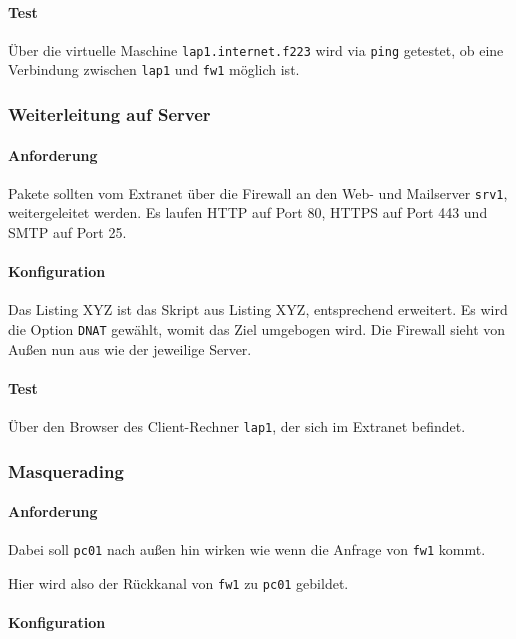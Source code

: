 \paragraph{Test} Über die virtuelle Maschine {\tt lap1.internet.f223} wird
via {\tt ping} getestet, ob eine Verbindung zwischen {\tt lap1} und {\tt fw1}
möglich ist.


\subsubsection{Weiterleitung auf Server}

\paragraph{Anforderung} Pakete sollten vom Extranet über die Firewall an
den Web- und Mailserver {\tt srv1}, weitergeleitet werden.
Es laufen HTTP auf Port 80, HTTPS auf Port 443 und SMTP auf Port 25.

\paragraph{Konfiguration} Das Listing XYZ ist das Skript
aus Listing XYZ, entsprechend erweitert.
Es wird die Option {\tt DNAT} gewählt, womit das Ziel umgebogen wird.
Die Firewall sieht von Außen nun aus wie der jeweilige Server.


\paragraph{Test} Über den Browser des Client-Rechner {\tt lap1},
der sich im Extranet befindet.


\subsubsection{Masquerading}

\paragraph{Anforderung}
Dabei soll {\tt pc01} nach außen hin wirken wie wenn die Anfrage von
{\tt fw1} kommt.

Hier wird also der Rückkanal von {\tt fw1} zu {\tt pc01} gebildet.

\paragraph{Konfiguration}


